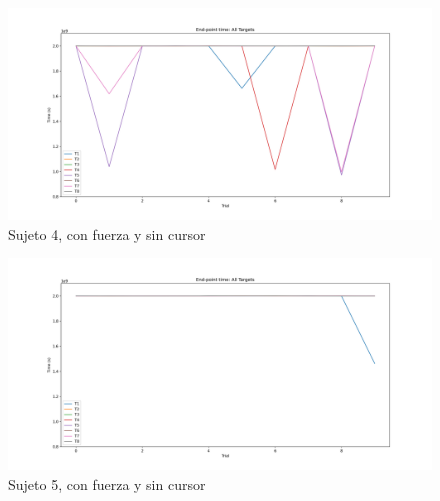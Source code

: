 \documentclass[a4paper,11pt, oneside]{book}
\begin{document}
\begin{figure}[H]
	\includegraphics[width=\linewidth]{sujeto4/force_no_cursor/evolution_time}
	\caption{Sujeto 4, con  fuerza y sin cursor}
	\label{4-4-3}
\end{figure}
\begin{figure}[H]
	\includegraphics[width=\linewidth]{sujeto5/force_no_cursor/evolution_time}
	\caption{Sujeto 5, con  fuerza y sin cursor}
	\label{5-4-3}
\end{figure}
\end{document}
